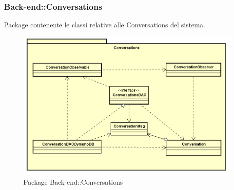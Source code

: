 \subsubsection{Back-end::Conversations}
Package contenente le classi relative alle Conversations del sistema.
\begin{figure}[h] \centering 
\includegraphics[width=\textwidth,height=\textheight,keepaspectratio]{images/diagrams/back-end/Official_Backend_0304/Conversations.png}
\caption{Package Back-end::Conversations}
\end{figure}
\newpage

